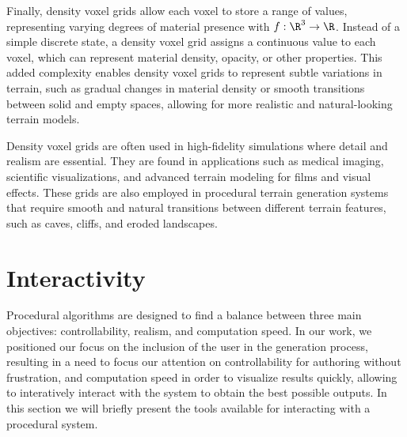 Finally, density voxel grids allow each voxel to store a range of values, representing varying degrees of material presence with $f: \R^3 \to \R$. Instead of a simple discrete state, a density voxel grid assigns a continuous value to each voxel, which can represent material density, opacity, or other properties. This added complexity enables density voxel grids to represent subtle variations in terrain, such as gradual changes in material density or smooth transitions between solid and empty spaces, allowing for more realistic and natural-looking terrain models.


Density voxel grids are often used in high-fidelity simulations where detail and realism are essential. They are found in applications such as medical imaging, scientific visualizations, and advanced terrain modeling for films and visual effects. These grids are also employed in procedural terrain generation systems that require smooth and natural transitions between different terrain features, such as caves, cliffs, and eroded landscapes.




\section{Interactivity}
Procedural algorithms are designed to find a balance between three main objectives: controllability, realism, and computation speed.
In our work, we positioned our focus on the inclusion of the user in the generation process, resulting in a need to focus our attention on controllability for authoring without frustration, and computation speed in order to visualize results quickly, allowing to interatively interact with the system to obtain the best possible outputs. In this section we will briefly present the tools available for interacting with a procedural system.

